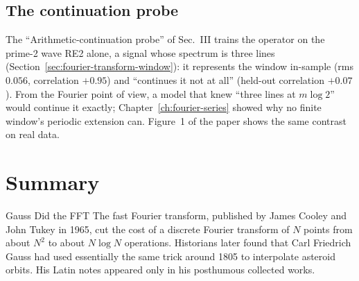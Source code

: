 \subsection{The continuation probe}

The ``Arithmetic-continuation probe'' of Sec.~III trains the operator on the prime-2 wave RE2 alone, a signal whose spectrum is three lines (Section~\ref{sec:fourier-transform-window}): it represents the window in-sample (rms $0.056$, correlation $+0.95$) and ``continues it not at all'' (held-out correlation $+0.07$). From the Fourier point of view, a model that knew ``three lines at $m\log2$'' would continue it exactly; Chapter~\ref{ch:fourier-series} showed why no finite window's periodic extension can. Figure~1 of the paper shows the same contrast on real data.

\section{Summary}
\begin{didyouknow}{Gauss Did the FFT}
The fast Fourier transform, published by James Cooley and John Tukey in 1965, cut the cost of a discrete Fourier transform of $N$ points from about $N^2$ to about $N\log N$ operations. Historians later found that Carl Friedrich Gauss had used essentially the same trick around 1805 to interpolate asteroid orbits. His Latin notes appeared only in his posthumous collected works.
\end{didyouknow}

